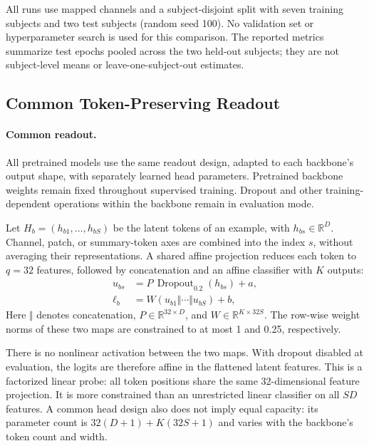 \documentclass{article}
\begin{document}
All runs use mapped channels and a subject-disjoint split with seven
training subjects and two test subjects (random seed 100). No validation
set or hyperparameter search is used for this comparison. The reported
metrics summarize test epochs pooled across the two held-out subjects;
they are not subject-level means or leave-one-subject-out estimates.

\subsection{Common Token-Preserving Readout}
\label{sec:head-method}

\paragraph{Common readout.}
All pretrained models use the same readout design, adapted to each backbone's output
shape, with separately learned head parameters. Pretrained backbone weights
remain fixed throughout supervised training. Dropout and other
training-dependent operations within the backbone remain in evaluation
mode.

Let $H_b=(h_{b1},\ldots,h_{bS})$ be the latent tokens of an example, with
$h_{bs}\in\mathbb{R}^{D}$. Channel, patch, or summary-token axes are combined
into the index $s$, without averaging their representations. A shared
affine projection reduces each token to $q=32$ features, followed by
concatenation and an affine classifier with $K$ outputs:
\begin{align}
    u_{bs}&=P\,\operatorname{Dropout}_{0.2}(h_{bs})+a,\\
    \ell_b&=W(u_{b1}\Vert\cdots\Vert u_{bS})+b,
    \label{eq:common-probe}
\end{align}
Here $\Vert$ denotes concatenation, $P\in\mathbb{R}^{32\times D}$, and
$W\in\mathbb{R}^{K\times32S}$. The row-wise weight norms of these two
maps are constrained to at most 1 and 0.25, respectively.

There is no nonlinear activation between the two maps. With dropout
disabled at evaluation, the logits are therefore affine in the flattened
latent features. This is a factorized linear probe: all token positions
share the same 32-dimensional feature projection. It is more constrained
than an unrestricted linear classifier on all $SD$ features. A common
head design also does not imply equal capacity: its parameter count is
$32(D+1)+K(32S+1)$ and varies with the backbone's token count and width.
\end{document}
